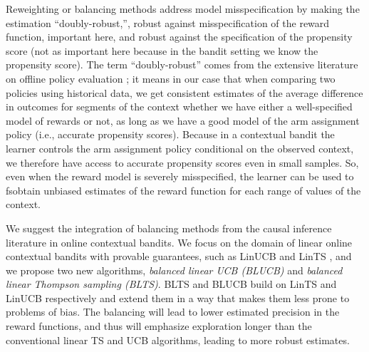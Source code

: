 \documentclass[letterpaper]{article} %
\begin{document}
Reweighting or balancing methods address model misspecification by making the estimation ``doubly-robust,'', robust against misspecification of the reward function, important here, and robust against the specification of the propensity score (not as important here because in the bandit setting we know the propensity score).  The term ``doubly-robust'' comes from the extensive literature on offline policy evaluation \cite{scharfstein1999adjusting}; it means in our case that when comparing two policies using historical data, we get consistent estimates of the average difference in outcomes for segments of the context whether we have either a well-specified model of rewards  or not, as long as we   have a good model of the arm assignment policy (i.e., accurate propensity scores). Because in a contextual bandit the learner controls the arm assignment policy conditional on the observed context,  we therefore  have access to accurate propensity scores even in small samples. So, even when the reward model is severely misspecified,  the learner can be used to fsobtain unbiased estimates of the reward function for each range of values of the context.

We suggest the integration of balancing methods from the causal inference literature \cite{imbens-ci} in online contextual bandits.
We focus on the domain of linear online contextual bandits with provable guarantees, such as LinUCB \cite{li-linucb} and LinTS \cite{agrawal-lints}, and we propose two new algorithms, \textit{balanced linear UCB (BLUCB)} and \textit{balanced linear Thompson sampling (BLTS)}.
BLTS and BLUCB build on LinTS and LinUCB respectively and extend them
in a way that makes them less prone to problems of bias. The balancing will lead to lower estimated precision in the reward functions, and thus will emphasize exploration longer than the conventional linear TS and UCB algorithms, leading to more robust estimates.
\end{document}
